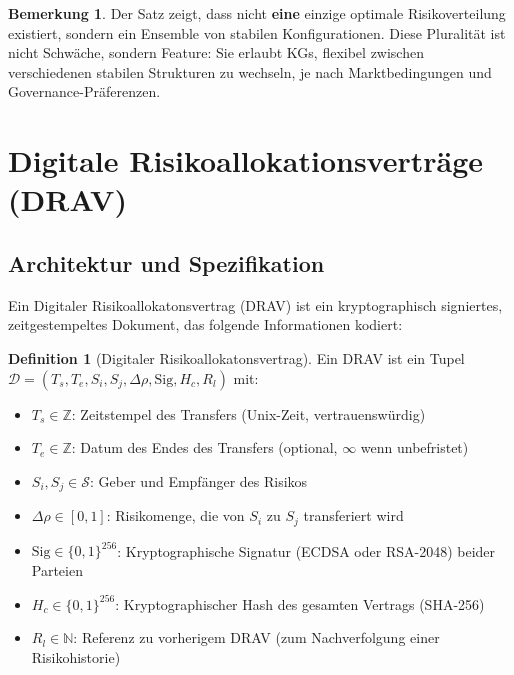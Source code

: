 \documentclass[a4paper, 12pt, twoside, openright]{report}
\theoremstyle{definition}
\newtheorem{definition}[theorem]{Definition}
\theoremstyle{definition}
\newtheorem{bemerkung}{Bemerkung}[chapter]
\begin{document}
\begin{bemerkung}
Der Satz zeigt, dass nicht \textbf{eine} einzige optimale Risikoverteilung existiert, sondern ein Ensemble von stabilen Konfigurationen. Diese Pluralität ist nicht Schwäche, sondern Feature: Sie erlaubt KGs, flexibel zwischen verschiedenen stabilen Strukturen zu wechseln, je nach Marktbedingungen und Governance-Präferenzen.
\end{bemerkung}

\section{Digitale Risikoallokationsverträge (DRAV)}

\subsection{Architektur und Spezifikation}

Ein Digitaler Risikoallokatonsvertrag (DRAV) ist ein kryptographisch signiertes, zeitgestempeltes Dokument, das folgende Informationen kodiert:

\begin{definition}[Digitaler Risikoallokatonsvertrag]
Ein DRAV ist ein Tupel $\mathcal{D} = (T_s, T_e, S_i, S_j, \Delta\rho, \text{Sig}, H_c, R_l)$ mit:
\begin{itemize}
    \item $T_s \in \mathbb{Z}$: Zeitstempel des Transfers (Unix-Zeit, vertrauenswürdig)
    \item $T_e \in \mathbb{Z}$: Datum des Endes des Transfers (optional, $\infty$ wenn unbefristet)
    \item $S_i, S_j \in \mathcal{S}$: Geber und Empfänger des Risikos
    \item $\Delta\rho \in [0,1]$: Risikomenge, die von $S_i$ zu $S_j$ transferiert wird
    \item $\text{Sig} \in \{0,1\}^{256}$: Kryptographische Signatur (ECDSA oder RSA-2048) beider Parteien
    \item $H_c \in \{0,1\}^{256}$: Kryptographischer Hash des gesamten Vertrags (SHA-256)
    \item $R_l \in \mathbb{N}$: Referenz zu vorherigem DRAV (zum Nachverfolgung einer Risikohistorie)
\end{itemize}
\end{definition}
\end{document}
